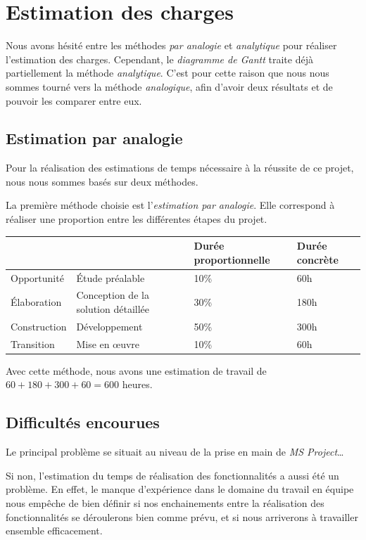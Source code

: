 \documentclass[etudiants]{support-iutrs}
\begin{document}
\header

\section{Estimation des charges} 
Nous avons hésité entre les méthodes \emph{par analogie} et \emph{analytique} pour réaliser l'estimation des charges.
Cependant, le \emph{diagramme de Gantt} traite déjà partiellement la méthode \emph{analytique}. 
C'est pour cette raison que nous nous sommes tourné vers la méthode \emph{analogique}, afin d'avoir deux résultats et de pouvoir les comparer entre eux. 

\subsection{Estimation par analogie}

Pour la réalisation des estimations de temps nécessaire à la réussite de ce projet,
nous nous sommes basés sur deux méthodes. 

La première méthode choisie est l'\emph{estimation par analogie}.
Elle correspond à réaliser une proportion entre les différentes étapes du projet. 

\begin{tabular}{|l l|l|l|}
\hline
&& Durée proportionnelle & Durée concrète \\
\hline
Opportunité & Étude préalable & 10\% & 60h \\
\hline
Élaboration & Conception de la solution détaillée & 30\% & 180h \\
\hline
Construction & Développement & 50\% & 300h \\
\hline
Transition & Mise en œuvre & 10\% & 60h \\
\hline
\end{tabular}

Avec cette méthode, nous avons une estimation de travail de $60 + 180 + 300 + 60 = 600$ heures. 


\subsection{Difficultés encourues} 
Le principal problème se situait au niveau de la prise en main de \emph{MS Project}…

Si non, l'estimation du temps de réalisation des fonctionnalités a aussi été un problème. 
En effet, le manque d'expérience dans le domaine du travail en équipe nous empêche de bien définir si nos enchainements entre la réalisation des fonctionnalités se  déroulerons bien comme prévu, et si nous arriverons à travailler ensemble efficacement. 
\end{document}
